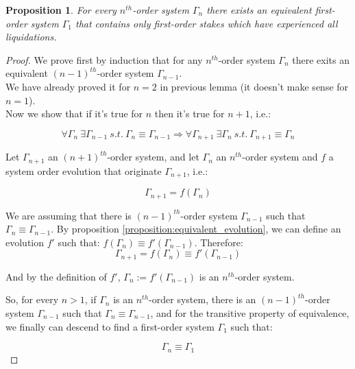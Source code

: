 \documentclass[reqno]{article}
\newtheorem{proposition}[theorem]{Proposition}
\begin{document}
\begin{proposition} \label{result:6}
  For every $n^{th}$-order system $\Gamma_n$ there exists an equivalent first-order system $\Gamma_1$ that contains only first-order stakes which have experienced all liquidations.
\end{proposition}

\begin{proof}
  We prove first by induction that for any $n^{th}$-order system $\Gamma_n$ there exits an equivalent $(n-1)^{th}$-order system $\Gamma_{n-1}$.\\
  We have already proved it for $n=2$ in previous lemma (it doesn’t make sense for $n=1$).\\
  Now we show that if it’s true for $n$ then it’s true for $n+1$, i.e.:

\begin{equation}
  \forall \Gamma_n\ \exists \Gamma_{n-1}\ s.t.\ \Gamma_n \equiv \Gamma_{n-1} \Rightarrow \forall \Gamma_{n+1}\ \exists \Gamma_n\ s.t.\ \Gamma_{n+1} \equiv \Gamma_n
\end{equation}

Let $\Gamma_{n+1}$ an $(n+1)^{th}$-order system, and let $\Gamma_n$ an $n^{th}$-order system and $f$ a system order evolution that originate $\Gamma_{n+1}$, i.e.:

\begin{equation}
  \Gamma_{n+1} = f(\Gamma_n)
\end{equation}

We are assuming that there is $(n-1)^{th}$-order system $\Gamma_{n-1}$ such that $\Gamma_n \equiv \Gamma_{n-1}$. By proposition \ref{proposition:equivalent_evolution}, we can define an evolution $f'$ such that: $f(\Gamma_n) \equiv f'(\Gamma_{n-1})$. Therefore:
\begin{equation}
    \Gamma_{n+1} = f(\Gamma_n) \equiv f'(\Gamma_{n-1})
\end{equation}

And by the definition of $f'$, $ \Gamma_n := f'(\Gamma_{n-1})$ is an $n^{th}$-order system.

\bigskip
So, for every $n > 1$, if $\Gamma_n$ is an $n^{th}$-order system, there is an $(n-1)^{th}$-order system $\Gamma_{n-1}$ such that $\Gamma_n \equiv \Gamma_{n-1}$, and for the transitive property of equivalence, we finally can descend to find a first-order system $\Gamma_1$ such that:

\begin{equation}
    \Gamma_n \equiv \Gamma_1
\end{equation}
\end{proof}
\end{document}
